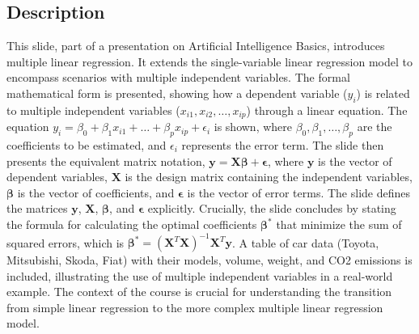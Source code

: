 \documentclass{article}%
\begin{document}
\subsection{Description}%
This slide, part of a presentation on Artificial Intelligence Basics, introduces multiple linear regression. It extends the single-variable linear regression model to encompass scenarios with multiple independent variables.  The formal mathematical form is presented, showing how a dependent variable ($y_i$) is related to multiple independent variables ($x_{i1}, x_{i2}, \dots, x_{ip}$) through a linear equation.  The equation $y_i = \beta_0 + \beta_1 x_{i1} + \dots + \beta_p x_{ip} + \epsilon_i$ is shown, where $\beta_0, \beta_1, \dots, \beta_p$ are the coefficients to be estimated, and $\epsilon_i$ represents the error term.  The slide then presents the equivalent matrix notation, $\mathbf{y} = \mathbf{X}\mathbf{\beta} + \mathbf{\epsilon}$, where $\mathbf{y}$ is the vector of dependent variables, $\mathbf{X}$ is the design matrix containing the independent variables, $\mathbf{\beta}$ is the vector of coefficients, and $\mathbf{\epsilon}$ is the vector of error terms.  The slide defines the matrices $\mathbf{y}$, $\mathbf{X}$, $\mathbf{\beta}$, and $\mathbf{\epsilon}$ explicitly.  Crucially, the slide concludes by stating the formula for calculating the optimal coefficients $\mathbf{\beta}^*$ that minimize the sum of squared errors, which is $\mathbf{\beta}^* = (\mathbf{X}^T \mathbf{X})^{-1} \mathbf{X}^T \mathbf{y}$.  A table of car data (Toyota, Mitsubishi, Skoda, Fiat) with their models, volume, weight, and CO2 emissions is included, illustrating the use of multiple independent variables in a real-world example. The context of the course is crucial for understanding the transition from simple linear regression to the more complex multiple linear regression model.%
\end{document}
